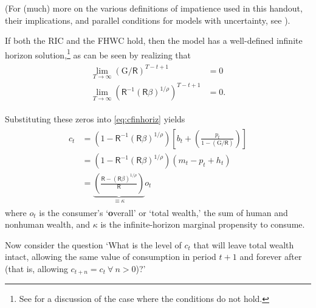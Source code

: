 \documentclass{scrartcl}
\begin{document}
(For (much) more on the various definitions of impatience used in this handout, their implications, and parallel conditions for models with uncertainty, see \cite{BufferStockTheory}).

If both the RIC and the FHWC hold, then the model has a well-defined 
infinite horizon solution,\footnote{See \cite{BufferStockTheory} for a discussion of the case where the conditions do not hold.} as can be seen by realizing that 
\begin{equation}\begin{gathered}\begin{aligned}
   \lim_{T \rightarrow \infty} ({\ensuremath{\mathrm{G}}}/\mathsf{R})^{T-t+1} & =  0
\\ \lim_{T \rightarrow \infty} (\mathsf{R}^{-1}(\mathsf{R}\beta)^{1/\rho})^{T-t+1} & = 0
.
\end{aligned}\end{gathered}\end{equation}

Substituting these zeros into \eqref{eq:cfinhoriz} yields 
\begin{equation}\begin{gathered}\begin{aligned}
        \boldsymbol{\mathit{c}}_{t} & =  \left(1-\mathsf{R}^{-1}(\mathsf{R}\beta)^{1/\rho}\right)\left[\boldsymbol{\mathit{b}}_{t}+\left(\frac{\boldsymbol{\mathit{p}}_{t}}{1-({\ensuremath{\mathrm{G}}}/\mathsf{R})}\right)\right] %
\\      & =  \left(1-\mathsf{R}^{-1}(\mathsf{R}\beta)^{1/\rho}\right)\left(\boldsymbol{\mathit{m}}_{t}-\boldsymbol{\mathit{p}}_{t}+\boldsymbol{\mathit{h}}_{t}\right)  %
\\      & =  \underbrace{\left(\frac{\mathsf{R} -(\mathsf{R}\beta)^{1/\rho}}{\mathsf{R}}\right)}_{ \equiv \kappa} \boldsymbol{\mathit{o}}_{t} \label{eq:cOfw}
\end{aligned}\end{gathered}\end{equation}
where $\boldsymbol{\mathit{o}}_{t}$ is the consumer's `\textbf{o}verall' or `total wealth,' the sum of human and 
nonhuman wealth, and $\kappa$ is the infinite-horizon marginal propensity to consume.

Now consider the question `What is the level of $\boldsymbol{\mathit{c}}_{t}$ that will 
leave total wealth intact, allowing the same value of consumption in 
period $t+1$ and forever after (that is, allowing $\boldsymbol{\mathit{c}}_{t+n}=\boldsymbol{\mathit{c}}_{t}~\forall~n>0$)?'  
\end{document}
